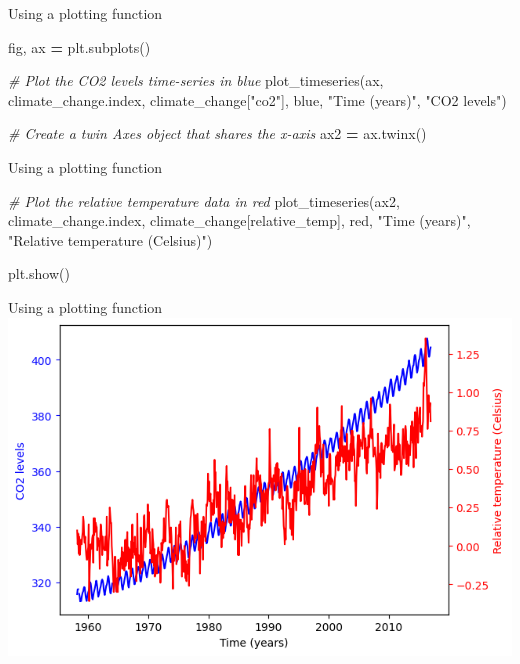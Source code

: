 \documentclass[
  ignorenonframetext,
]{beamer}
\newenvironment{Shaded}{\begin{snugshade}}{\end{snugshade}}
\newcommand{\CommentTok}[1]{\textcolor[rgb]{0.56,0.35,0.01}{\textit{#1}}}
\newcommand{\NormalTok}[1]{#1}
\newcommand{\OperatorTok}[1]{\textcolor[rgb]{0.81,0.36,0.00}{\textbf{#1}}}
\newcommand{\StringTok}[1]{\textcolor[rgb]{0.31,0.60,0.02}{#1}}
\begin{document}
\begin{frame}[fragile]{Using a plotting function}
\label{using-a-plotting-function-3}

\begin{Shaded}
\begin{Highlighting}[]
\NormalTok{fig, ax }\OperatorTok{=}\NormalTok{ plt.subplots()}

\CommentTok{\# Plot the CO2 levels time{-}series in blue}
\NormalTok{plot\_timeseries(ax, climate\_change.index, climate\_change[}\StringTok{"co2"}\NormalTok{], }\StringTok{\textquotesingle{}blue\textquotesingle{}}\NormalTok{, }\StringTok{"Time (years)"}\NormalTok{, }\StringTok{"CO2 levels"}\NormalTok{)}

\CommentTok{\# Create a twin Axes object that shares the x{-}axis}
\NormalTok{ax2 }\OperatorTok{=}\NormalTok{ ax.twinx()}
\end{Highlighting}
\end{Shaded}
\end{frame}

\begin{frame}[fragile]{Using a plotting function}
\label{using-a-plotting-function-4}

\begin{Shaded}
\begin{Highlighting}[]
\CommentTok{\# Plot the relative temperature data in red}
\NormalTok{plot\_timeseries(ax2, climate\_change.index, climate\_change[}\StringTok{\textquotesingle{}relative\_temp\textquotesingle{}}\NormalTok{], }\StringTok{\textquotesingle{}red\textquotesingle{}}\NormalTok{, }\StringTok{"Time (years)"}\NormalTok{, }\StringTok{"Relative temperature (Celsius)"}\NormalTok{)}

\NormalTok{plt.show()}
\end{Highlighting}
\end{Shaded}
\end{frame}

\begin{frame}{Using a plotting function}
\label{using-a-plotting-function-5}
\includegraphics{../images/im236.png}
\end{frame}
\end{document}

